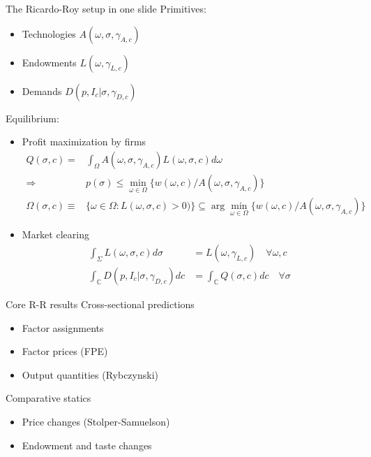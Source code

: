 \documentclass[10pt,notes=hide]{beamer}
\begin{document}
\begin{frame}{The Ricardo-Roy setup in one slide}
Primitives: 
\begin{itemize}
	\item Technologies $A(\omega,\sigma,\gamma_{A,c})$
	\item Endowments $L(\omega,\gamma_{L,c})$
	\item Demands $D(p,I_c\vert\sigma,\gamma_{D,c})$
\end{itemize}
Equilibrium:
\begin{itemize}
	\item Profit maximization by firms
\begin{align*}
Q(\sigma,c) =&\int_{\Omega} A(\omega,\sigma,\gamma_{A,c})L(\omega,\sigma,c)d\omega \\
\Rightarrow & p(\sigma) \leq \min_{\omega\in\Omega} \{w(\omega,c) / A(\omega,\sigma,\gamma_{A,c}) \} \\
 \Omega(\sigma,c) \equiv & \{\omega\in\Omega:L(\omega,\sigma,c)>0)\}  \subseteq \arg\min_{\omega\in\Omega} \{w(\omega,c) / A(\omega,\sigma,\gamma_{A,c}) \} 
\end{align*}
\item Market clearing
\begin{align*}
\int_{\Sigma} L(\omega,\sigma,c)d\sigma &= L(\omega,\gamma_{L,c}) \quad \forall \omega,c \\
\int_{\mathbb{C}} D(p,I_c\vert\sigma,\gamma_{D,c})dc  &= \int_{\mathbb{C}} Q(\sigma,c) dc \quad \forall \sigma
\end{align*}
\end{itemize}
\end{frame}
\begin{frame}{Core R-R results}
Cross-sectional predictions
\begin{itemize}
	\item Factor assignments
	\item Factor prices (FPE)
	\item Output quantities (Rybczynski)
\end{itemize}
Comparative statics
\begin{itemize}
	\item Price changes (Stolper-Samuelson)
	\item Endowment and taste changes
\end{itemize}
\end{frame}
\end{document}
